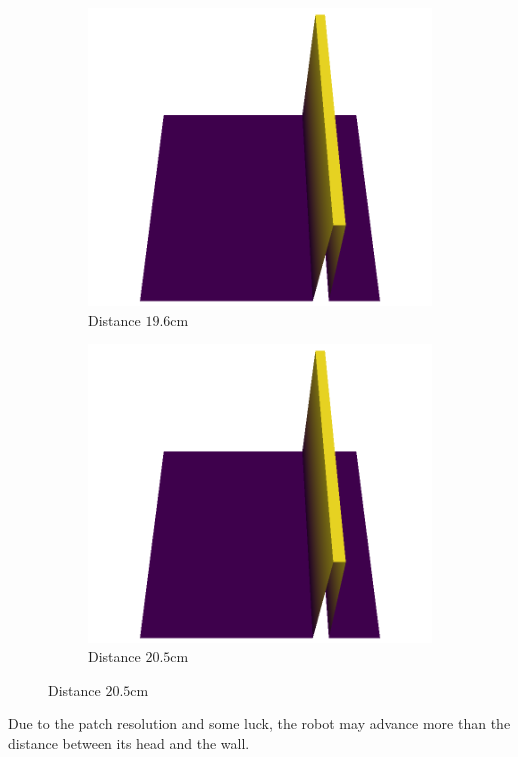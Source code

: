 \documentclass[../document.tex]{subfiles}
\begin{document}
\begin{figure}[H]
\begin{subfigure}[b]{0.33\textwidth}
    \end{subfigure}   \\
    \begin{subfigure}[b]{0.33\textwidth}
        \includegraphics[width=\linewidth]{../img/5/custom_patches/walls_front/1-3d.png}
        \caption{Distance  $19.6$cm}
    \end{subfigure}   
    \begin{subfigure}[b]{0.33\textwidth}
        \includegraphics[width=\linewidth]{../img/5/custom_patches/walls_front/1-3d.png}
        \caption{Distance $20.5$cm}
    \end{subfigure}   
\end{figure}
Due to the patch resolution and some luck, the robot may advance more than the distance between its head and the wall. 
\end{document}
